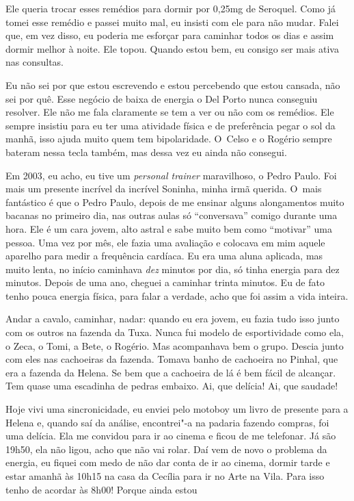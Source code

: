 Ele queria trocar esses remédios para dormir por 0,25mg de Seroquel.
Como já tomei esse remédio e passei muito mal, eu insisti com ele para
não mudar. Falei que, em vez disso, eu poderia me esforçar para caminhar
todos os dias e assim dormir melhor à noite. Ele topou. Quando estou
bem, eu consigo ser mais ativa nas consultas.

Eu não sei por que estou escrevendo e estou percebendo que estou
cansada, não sei por quê. Esse negócio de baixa de energia o Del Porto
nunca conseguiu resolver. Ele não me fala claramente se tem a ver ou não
com os remédios. Ele sempre insistiu para eu ter uma atividade física e
de preferência pegar o sol da manhã, isso ajuda muito quem tem
bipolaridade. O~Celso e o Rogério sempre bateram nessa tecla também, mas
dessa vez eu ainda não consegui.

Em 2003, eu acho, eu tive um \emph{personal trainer} maravilhoso, o
Pedro Paulo. Foi mais um presente incrível da incrível Soninha, minha
irmã querida. O~mais fantástico é que o Pedro Paulo, depois de me
ensinar alguns alongamentos muito bacanas no primeiro dia, nas outras
aulas só ``conversava'' comigo durante uma hora. Ele é um cara jovem,
alto astral e sabe muito bem como ``motivar'' uma pessoa. Uma vez por
mês, ele fazia uma avaliação e colocava em mim aquele aparelho para
medir a frequência cardíaca. Eu era uma aluna aplicada, mas muito lenta,
no início caminhava \emph{dez} minutos por dia, só tinha energia para
dez minutos. Depois de uma ano, cheguei a caminhar trinta minutos. Eu de
fato tenho pouca energia física, para falar a verdade, acho que foi
assim a vida inteira.

Andar a cavalo, caminhar, nadar: quando eu era jovem, eu fazia tudo isso
junto com os outros na fazenda da Tuxa. Nunca fui modelo de
esportividade como ela, o Zeca, o Tomi, a Bete, o Rogério. Mas
acompanhava bem o grupo. Descia junto com eles nas cachoeiras da fazenda.
Tomava banho de cachoeira no Pinhal, que era a fazenda da Helena.
Se bem que a cachoeira de lá é bem fácil de alcançar. Tem quase uma
escadinha de pedras embaixo. Ai, que delícia! Ai, que saudade!

Hoje vivi uma sincronicidade, eu enviei pelo motoboy um livro de
presente para a Helena e, quando saí da análise, encontrei"-a na padaria
fazendo compras, foi uma delícia. Ela me convidou para ir ao cinema e
ficou de me telefonar. Já são 19h50, ela não ligou, acho que não vai
rolar. Daí vem de novo o problema da energia, eu fiquei com medo de não
dar conta de ir ao cinema, dormir tarde e estar amanhã às 10h15 na casa
da Cecília para ir no Arte na Vila. Para isso tenho de acordar às 8h00!
Porque ainda estou

